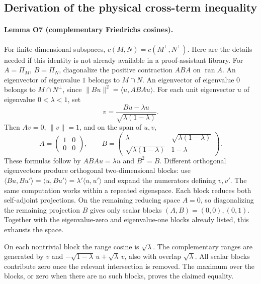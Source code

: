 \subsection{Derivation of the physical cross-term inequality}

\paragraph{Lemma O7 (complementary Friedrichs cosines).}
For finite-dimensional subspaces,
$c(M,N)=c(M^\perp,N^\perp)$.
Here are the details needed if this identity is not already available
in a proof-assistant library. For $A=\Pi_M$, $B=\Pi_N$, diagonalize
the positive contraction $ABA$ on $\operatorname{ran}A$.
An eigenvector of eigenvalue $1$ belongs to $M\cap N$.
An eigenvector of eigenvalue $0$ belongs to $M\cap N^\perp$, since
$\|Bu\|^2=\langle u,ABA u\rangle$.
For each unit eigenvector $u$ of eigenvalue $0<\lambda<1$, set
\[
 v=\frac{Bu-\lambda u}{\sqrt{\lambda(1-\lambda)}}.
\]
Then $Av=0$, $\|v\|=1$, and on the span of $u,v$,
\[
 A=\begin{pmatrix}1&0\\0&0\end{pmatrix},\qquad
 B=\begin{pmatrix}\lambda&\sqrt{\lambda(1-\lambda)}\\
 \sqrt{\lambda(1-\lambda)}&1-\lambda\end{pmatrix}.
\]
These formulas follow by $ABA u=\lambda u$ and $B^2=B$.
Different orthogonal eigenvectors produce orthogonal two-dimensional
blocks: use
$\langle Bu,Bu'\rangle=\langle u,Bu'\rangle
=\lambda'\langle u,u'\rangle$
and expand the numerators defining $v,v'$.
The same computation works within a repeated eigenspace.
Each block reduces both self-adjoint projections.
On the remaining reducing space $A=0$, so diagonalizing the remaining
projection $B$ gives only scalar blocks $(A,B)=(0,0),(0,1)$.
Together with the eigenvalue-zero and eigenvalue-one blocks already
listed, this exhausts the space.

On each nontrivial block the range cosine is $\sqrt\lambda$.
The complementary ranges are generated by $v$ and
$-\sqrt{1-\lambda}\,u+\sqrt\lambda\,v$, also with overlap
$\sqrt\lambda$. All scalar blocks contribute zero once the relevant
intersection is removed. The maximum over the blocks, or zero when
there are no such blocks, proves the claimed equality.

